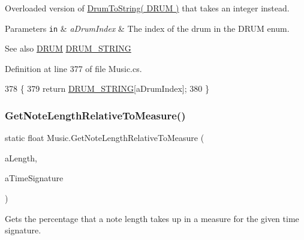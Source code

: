 Overloaded version of \hyperlink{group___music_stat_func_gaf5f64ebe9a7e036e07f283e41f26d22b}{Drum\+To\+String( D\+R\+U\+M )} that takes an integer instead. 


\begin{DoxyParams}[1]{Parameters}
\mbox{\tt in}  & {\em a\+Drum\+Index} & The index of the drum in the D\+R\+UM enum.\\
\hline
\end{DoxyParams}
\begin{DoxySeeAlso}{See also}
\hyperlink{group___music_enums_gade475b4382c7066d1af13e7c13c029b6}{D\+R\+UM} \hyperlink{group___music_constants_ga1381281d147886a2cf3584ab0c7a67d6}{D\+R\+U\+M\+\_\+\+S\+T\+R\+I\+NG} 
\end{DoxySeeAlso}


Definition at line 377 of file Music.\+cs.


\begin{DoxyCode}
378     \{
379         \textcolor{keywordflow}{return} \hyperlink{group___music_constants_ga1381281d147886a2cf3584ab0c7a67d6}{DRUM\_STRING}[aDrumIndex];
380     \}
\end{DoxyCode}
\mbox{\label{group___music_stat_func_ga91e290b48ad2289493ba4421308abe49}} 
\subsubsection{\texorpdfstring{Get\+Note\+Length\+Relative\+To\+Measure()}{GetNoteLengthRelativeToMeasure()}}
{\footnotesize\ttfamily static float Music.\+Get\+Note\+Length\+Relative\+To\+Measure (\begin{DoxyParamCaption}\item[{\hyperlink{group___music_enums_gaf11b5f079adbb21c800b9eca1c5c3cbd}{N\+O\+T\+E\+\_\+\+L\+E\+N\+G\+TH}}]{a\+Length,  }\item[{\hyperlink{group___music_structs_struct_music_1_1_time_signature}{Time\+Signature}}]{a\+Time\+Signature }\end{DoxyParamCaption})\hspace{0.3cm}{\ttfamily [static]}}



Gets the percentage that a note length takes up in a measure for the given time signature. 


